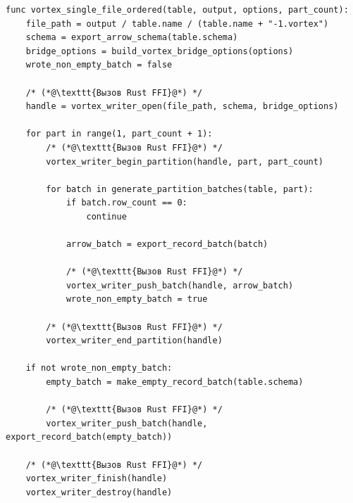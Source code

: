 \begin{lstlisting}[caption={Запись таблицы в формат Vortex}]
func vortex_single_file_ordered(table, output, options, part_count):
    file_path = output / table.name / (table.name + "-1.vortex")
    schema = export_arrow_schema(table.schema)
    bridge_options = build_vortex_bridge_options(options)
    wrote_non_empty_batch = false

    /* (*@\texttt{Вызов Rust FFI}@*) */
    handle = vortex_writer_open(file_path, schema, bridge_options)

    for part in range(1, part_count + 1):
        /* (*@\texttt{Вызов Rust FFI}@*) */
        vortex_writer_begin_partition(handle, part, part_count)

        for batch in generate_partition_batches(table, part):
            if batch.row_count == 0:
                continue

            arrow_batch = export_record_batch(batch)

            /* (*@\texttt{Вызов Rust FFI}@*) */
            vortex_writer_push_batch(handle, arrow_batch)
            wrote_non_empty_batch = true

        /* (*@\texttt{Вызов Rust FFI}@*) */
        vortex_writer_end_partition(handle)

    if not wrote_non_empty_batch:
        empty_batch = make_empty_record_batch(table.schema)

        /* (*@\texttt{Вызов Rust FFI}@*) */
        vortex_writer_push_batch(handle, export_record_batch(empty_batch))

    /* (*@\texttt{Вызов Rust FFI}@*) */
    vortex_writer_finish(handle)
    vortex_writer_destroy(handle)
\end{lstlisting}
